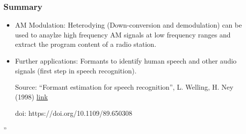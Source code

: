\documentclass[../main.tex]{subfiles}
\begin{document}
\subsubsection*{Summary}

\begin{itemize}
    \item AM Modulation: Heterodying (Down-conversion and demodulation) can be used to anaylze high frequency AM signals at low frequency ranges and extract the program content of a radio station.
    \item Further applications: Formants to identify human speech and other audio signals (first step in speech recognition).

    Source: ``Formant estimation for speech recognition'', L. Welling, H. Ney (1998) \href{https://ieeexplore.ieee.org/abstract/document/650308}{link}

    doi: https://doi.org/10.1109/89.650308
\end{itemize}''
\end{document}
